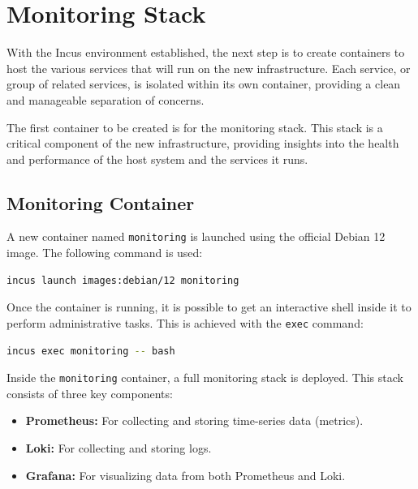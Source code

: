 \section{Monitoring Stack}

With the Incus environment established, the next step is to create containers to host the various services that will run on the new infrastructure. Each service, or group of related services, is isolated within its own container, providing a clean and manageable separation of concerns.

The first container to be created is for the monitoring stack. This stack is a critical component of the new infrastructure, providing insights into the health and performance of the host system and the services it runs.

\subsection*{Monitoring Container}

A new container named \texttt{monitoring} is launched using the official Debian 12 image. The following command is used:

\begin{lstlisting}[language=bash,caption={Creating the monitoring container with a Debian 12 image.}]
incus launch images:debian/12 monitoring
\end{lstlisting}

Once the container is running, it is possible to get an interactive shell inside it to perform administrative tasks. This is achieved with the \texttt{exec} command:

\begin{lstlisting}[language=bash,caption={Obtaining a shell inside the monitoring container.}]
incus exec monitoring -- bash
\end{lstlisting}

Inside the \texttt{monitoring} container, a full monitoring stack is deployed. This stack consists of three key components:

\begin{itemize}
    \item \textbf{Prometheus:} For collecting and storing time-series data (metrics).
    \item \textbf{Loki:} For collecting and storing logs.
    \item \textbf{Grafana:} For visualizing data from both Prometheus and Loki.
\end{itemize}

